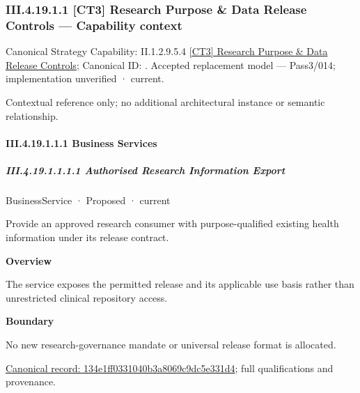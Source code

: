 \subsubsection*{III.4.19.1.1 [CT3] Research Purpose \& Data Release Controls — Capability context}
\label{navigation:III.4.19.1.1}

{\small Canonical Strategy Capability: II.1.2.9.5.4 \hyperref[element:6ca69337ffe1477292944524be0693c9]{[CT3] Research Purpose \& Data Release Controls}; Canonical ID: \texttt{}. Accepted replacement model — Pass3/014; implementation unverified · current.}\par
Contextual reference only; no additional architectural instance or semantic relationship.\par
\paragraph*{III.4.19.1.1.1 Business Services}
\label{navigation:III.4.19.1.1.1}

\subparagraph*{III.4.19.1.1.1.1 Authorised Research Information Export}
\label{navigation:III.4.19.1.1.1.1}

\label{element:134e1ff0331040b3a8069c9dc5e331d4}
{\small BusinessService · Proposed · current}\par

Provide an approved research consumer with purpose-qualified existing health information under its release contract.



\textbf{Overview}



The service exposes the permitted release and its applicable use basis rather than unrestricted clinical repository access.



\textbf{Boundary}



No new research-governance mandate or universal release format is allocated.


{\footnotesize \href{../../../../continuum/business/business-service/134e1ff0331040b3a8069c9dc5e331d4.md}{Canonical record: 134e1ff0331040b3a8069c9dc5e331d4}; full qualifications and provenance.}\par
